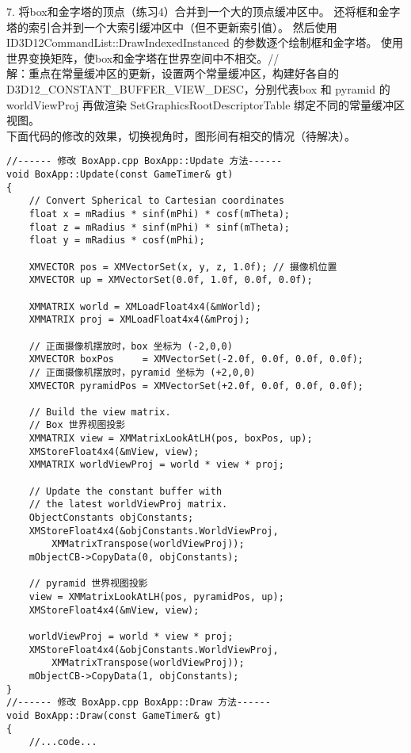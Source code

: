 \begin{flushleft}
7. 将box和金字塔的顶点（练习4）合并到一个大的顶点缓冲区中。 还将框和金字塔的索引合并到一个大索引缓冲区中（但不更新索引值）。 然后使用 ID3D12CommandList::DrawIndexedInstanced 的参数逐个绘制框和金字塔。 使用世界变换矩阵，使box和金字塔在世界空间中不相交。//
~\\
解：重点在常量缓冲区的更新，设置两个常量缓冲区，构建好各自的 D3D12\_CONSTANT\_BUFFER\_VIEW\_DESC，分别代表box 和 pyramid 的 worldViewProj 再做渲染
SetGraphicsRootDescriptorTable 绑定不同的常量缓冲区视图。\\
下面代码的修改的效果，切换视角时，图形间有相交的情况（待解决）。
\end{flushleft}
\begin{lstlisting}
//------ 修改 BoxApp.cpp BoxApp::Update 方法------
void BoxApp::Update(const GameTimer& gt)
{
    // Convert Spherical to Cartesian coordinates
    float x = mRadius * sinf(mPhi) * cosf(mTheta);
    float z = mRadius * sinf(mPhi) * sinf(mTheta);
    float y = mRadius * cosf(mPhi);

    XMVECTOR pos = XMVectorSet(x, y, z, 1.0f); // 摄像机位置
    XMVECTOR up = XMVectorSet(0.0f, 1.0f, 0.0f, 0.0f);

    XMMATRIX world = XMLoadFloat4x4(&mWorld);
    XMMATRIX proj = XMLoadFloat4x4(&mProj);
    
    // 正面摄像机摆放时，box 坐标为 (-2,0,0)
    XMVECTOR boxPos     = XMVectorSet(-2.0f, 0.0f, 0.0f, 0.0f); 
    // 正面摄像机摆放时，pyramid 坐标为 (+2,0,0)
    XMVECTOR pyramidPos = XMVectorSet(+2.0f, 0.0f, 0.0f, 0.0f); 

    // Build the view matrix.
    // Box 世界视图投影
    XMMATRIX view = XMMatrixLookAtLH(pos, boxPos, up);
    XMStoreFloat4x4(&mView, view);
    XMMATRIX worldViewProj = world * view * proj;

    // Update the constant buffer with 
    // the latest worldViewProj matrix.
    ObjectConstants objConstants;
    XMStoreFloat4x4(&objConstants.WorldViewProj, 
        XMMatrixTranspose(worldViewProj));
    mObjectCB->CopyData(0, objConstants);

    // pyramid 世界视图投影
    view = XMMatrixLookAtLH(pos, pyramidPos, up);
    XMStoreFloat4x4(&mView, view);

    worldViewProj = world * view * proj;
    XMStoreFloat4x4(&objConstants.WorldViewProj, 
        XMMatrixTranspose(worldViewProj));
    mObjectCB->CopyData(1, objConstants);
}
//------ 修改 BoxApp.cpp BoxApp::Draw 方法------
void BoxApp::Draw(const GameTimer& gt)
{
    //...code...


\end{lstlisting}
